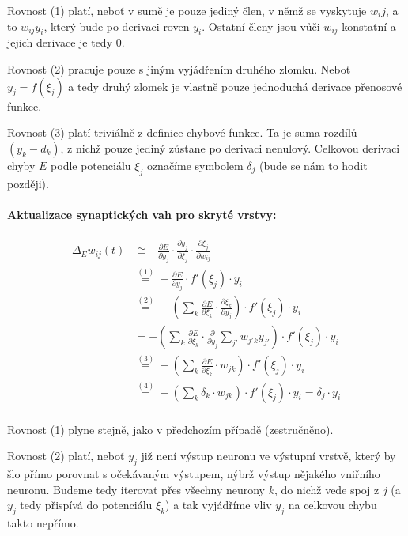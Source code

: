 \documentclass[11pt]{report} %
\begin{document}
Rovnost (1) platí, neboť v sumě je pouze jediný člen, v němž se vyskytuje  $w_ij$, a to $w_{ij}y_i$, který bude po derivaci roven $y_i$. Ostatní členy jsou vůči $w_{ij}$ konstatní a jejich derivace je tedy 0.

Rovnost (2) pracuje pouze s jiným vyjádřením druhého zlomku. Neboť $y_j = f(\xi_j)$ a tedy druhý zlomek je vlastně pouze jednoduchá derivace přenosové funkce.

Rovnost (3) platí triviálně z definice chybové funkce. Ta je suma rozdílů $(y_k - d_k)$, z nichž pouze jediný zůstane po derivaci nenulový. Celkovou derivaci chyby $E$ podle potenciálu $\xi_j$ označíme symbolem $\delta_j$ (bude se nám to hodit později).

\paragraph{Aktualizace synaptických vah pro skryté vrstvy:}
\begin{align*}
\Delta_E w_{ij}(t) 
&\cong -\frac{\partial E}{\partial y_j} \cdot \frac{\partial y_j}{\partial \xi_j} \cdot \frac{\partial \xi_j}{\partial w_{ij}}\\
&\stackrel{(1)}{=} -\frac{\partial E}{\partial y_j} \cdot f'(\xi_j) \cdot y_i\\
&\stackrel{(2)}{=} -\left(\sum\limits_k\frac{\partial E}{\partial\xi_k}\cdot\frac{\partial\xi_k}{\partial y_j} \right) \cdot f'(\xi_j) \cdot y_i \\
&= -\left(\sum\limits_k\frac{\partial E}{\partial\xi_k}\cdot\frac{\partial}{\partial y_j}\sum\limits_{j'}w_{j'k}y_{j'} \right) \cdot f'(\xi_j) \cdot y_i \\
&\stackrel{(3)}{=} -\left(\sum\limits_k\frac{\partial E}{\partial\xi_k}\cdot w_{jk} \right) \cdot f'(\xi_j) \cdot y_i \\
&\stackrel{(4)}{=} -\left(\sum\limits_k \delta_k\cdot w_{jk} \right) \cdot f'(\xi_j) \cdot y_i = \delta_j \cdot y_i\\
\end{align*}

Rovnost (1) plyne stejně, jako v předchozím případě (zestručněno). 

Rovnost (2) platí, neboť $y_j$ již není výstup neuronu ve výstupní vrstvě, který by šlo přímo porovnat s očekávaným výstupem, nýbrž výstup nějakého vniřního neuronu. Budeme tedy iterovat přes všechny neurony $k$, do nichž vede spoj z $j$ (a $y_j$ tedy přispívá do potenciálu $\xi_k$) a tak vyjádříme vliv $y_j$ na celkovou chybu takto nepřímo. 
\end{document}
